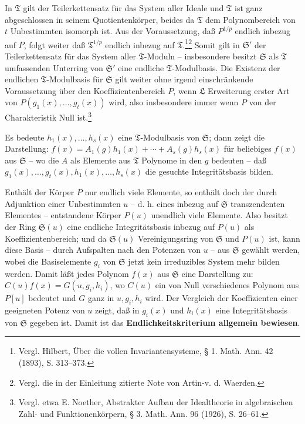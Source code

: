In $\mathfrak T$ gilt der Teilerkettensatz für das System aller Ideale und $\mathfrak T$ ist ganz abgeschlossen in seinem Quotientenkörper, beides da $\mathfrak T$ dem Polynombereich von $t$ Unbestimmten isomorph ist. Aus der Voraussetzung, daß $P^{1/p}$ endlich inbezug auf $P$, folgt weiter daß $\mathfrak T^{1/p}$ endlich inbezug auf $\mathfrak T$.\footnote{Vergl. Hilbert, Über die vollen Invariantensysteme, § 1. Math. Ann. 42 (1893), S. 313--373.}\footnote{Vergl. die in der Einleitung zitierte Note von Artin-v. d. Waerden.} Somit gilt in $\mathfrak S'$ der Teilerkettensatz für das System aller $\mathfrak T$-Moduln -- insbesondere besitzt $\mathfrak S$ als $\mathfrak T$ umfassenden Unterring von $\mathfrak S'$ eine endliche $\mathfrak T$-Modulbasis. Die Existenz der endlichen $\mathfrak T$-Modulbasis für $\mathfrak S$ gilt weiter ohne irgend einschränkende Voraussetzung über den Koeffizientenbereich $P$, wenn $\mathfrak L$ Erweiterung erster Art von $P(g_1(x),\ldots,g_t(x))$ wird, also insbesondere immer wenn $P$ von der Charakteristik Null ist.\footnote{Vergl. etwa E. Noether, Abstrakter Aufbau der Idealtheorie in algebraischen Zahl- und Funktionenkörpern, § 3. Math. Ann. 96 (1926), S. 26--61.}

Es bedeute $h_1(x),\ldots,h_s(x)$ eine $\mathfrak T$-Modulbasis von $\mathfrak S$; dann zeigt die Darstellung: $f(x)=A_1(g)h_1(x)+\cdots+A_s(g)h_s(x)$ für beliebiges $f(x)$ aus $\mathfrak S$ -- wo die $A$ als Elemente aus $\mathfrak T$ Polynome in den $g$ bedeuten -- daß $g_1(x),\ldots,g_t(x),h_1(x),\ldots,h_s(x)$ die gesuchte Integritätsbasis bilden.

Enthält der Körper $P$ nur endlich viele Elemente, so enthält doch der durch Adjunktion einer Unbestimmten $u$ -- d. h. eines inbezug auf $\mathfrak S$ transzendenten Elementes -- entstandene Körper $P(u)$ unendlich viele Elemente. Also besitzt der Ring $\mathfrak S(u)$ eine endliche Integritätsbasis inbezug auf $P(u)$ als Koeffizientenbereich; und da $\mathfrak S(u)$ Vereinigungsring von $\mathfrak S$ und $P(u)$ ist, kann diese Basis -- durch Aufspalten nach den Potenzen von $u$ -- aus $\mathfrak S$ gewählt werden, wobei die Basiselemente $g_i$ von $\mathfrak S$ jetzt kein irreduzibles System mehr bilden werden. Damit läßt jedes Polynom $f(x)$ aus $\mathfrak S$ eine Darstellung zu: $C(u)f(x)=G(u,g_i,h_i)$, wo $C(u)$ ein von Null verschiedenes Polynom aus $P[u]$ bedeutet und $G$ ganz in $u,g_i,h_i$ wird. Der Vergleich der Koeffizienten einer geeigneten Potenz von $u$ zeigt, daß in $g_i(x)$ und $h_i(x)$ eine Integritätsbasis von $\mathfrak S$ gegeben ist. Damit ist das \textbf{Endlichkeitskriterium allgemein bewiesen}.

